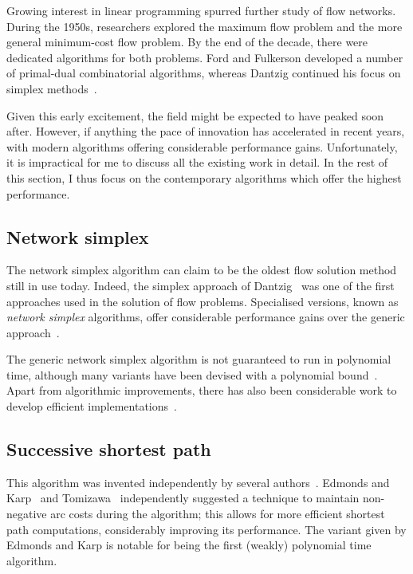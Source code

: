 Growing interest in linear programming spurred further study of flow networks. During the 1950s, researchers explored the maximum flow problem and the more general minimum-cost flow problem. By the end of the decade, there were dedicated algorithms for both problems. Ford and Fulkerson developed a number of primal-dual combinatorial algorithms, whereas Dantzig continued his focus on simplex methods~\cite{FordFulkerson:1962,Dantzig:1962}.

Given this early excitement, the field might be expected to have peaked soon after. However, if anything the pace of innovation has accelerated in recent years, with modern algorithms offering considerable performance gains. Unfortunately, it is impractical for me to discuss all the existing work in detail. In the rest of this section, I thus focus on the contemporary algorithms which offer the highest performance.

\subsection{Network simplex}

The network simplex algorithm can claim to be the oldest flow solution method still in use today. Indeed, the simplex approach of Dantzig~\cite{Dantzig:1949} was one of the first approaches used in the solution of flow problems. Specialised versions, known as \emph{network simplex} algorithms, offer considerable performance gains over the generic approach~\cite{Dantzig:1962}.

The generic network simplex algorithm is not guaranteed to run in polynomial time\footnotemark, although many variants have been devised with a polynomial bound~\cite{Tarjan:1991,Goldfarb:1992}. Apart from algorithmic improvements, there has also been considerable work to develop efficient implementations~\cite{Lobel:1996,Grigoriadis:1986}.

\subsection{Successive shortest path} \label{sec:intro-related-work-ssp}

This algorithm was invented independently by several authors~\cite{Jewell:1958,Iri:1960,BusackerGowen:1960}. Edmonds and Karp~\cite{Edmonds:1972} and Tomizawa~\cite{Tomizawa:1971} independently suggested a technique to maintain non-negative arc costs during the algorithm; this allows for more efficient shortest path computations, considerably improving its performance. The variant given by Edmonds and Karp is notable for being the first (weakly) polynomial time algorithm\footnotemark.

